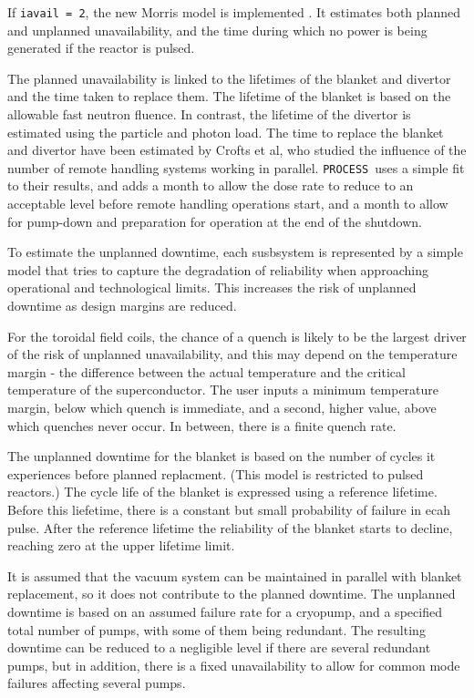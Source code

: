 \documentclass[11pt,a4paper]{report}
\newcommand{\process}{\mbox{\texttt{PROCESS}}}
\begin{document}
If \texttt{iavail = 2}, the new Morris model is implemented \cite{kovari_eng}. It estimates both planned and unplanned unavailability, and the time during which no power is being generated if the reactor is pulsed. 

The planned unavailability is linked to the lifetimes of the blanket and divertor and the time taken to replace them.  The lifetime of the blanket is based on the allowable fast neutron fluence.  In contrast, the lifetime of the divertor is estimated using the particle and photon load. The time to replace the blanket and divertor have been estimated by Crofts et al, who studied the influence of the number of remote handling systems working in parallel.  \process\ uses a simple fit to their results, and adds a month to allow the dose rate to reduce to an acceptable level before remote handling operations start, and a month to allow for pump-down and preparation for operation at the end of the shutdown.   

To estimate the unplanned downtime, each susbsystem is represented by a simple model that tries to capture the degradation of reliability when approaching operational and technological limits.  This increases the risk of unplanned downtime as design margins are reduced.

For the toroidal field coils, the chance of a quench is likely to be the largest driver of the risk of unplanned unavailability, and this may depend on the temperature margin - the difference between the actual temperature and the critical temperature of the superconductor.  The user inputs a minimum temperature margin, below which quench is immediate, and a second, higher value, above which quenches never occur.  In between, there is a finite quench rate.

The unplanned downtime for the blanket is based on the number of cycles it experiences before planned replacment.  (This model is restricted to pulsed reactors.) The cycle life of the blanket is expressed using a reference lifetime.  Before this liefetime, there is a constant but small probability of failure in ecah pulse.  After the reference lifetime the reliability of the blanket starts to decline, reaching zero at the upper lifetime limit.

It is assumed that the vacuum system can be maintained in parallel with blanket replacement, so it does not contribute to the planned downtime.  The unplanned downtime is based on an assumed failure rate for a cryopump, and a specified total number of pumps, with some of them being redundant.  The resulting downtime can be reduced to a negligible level if there are several redundant pumps, but in addition, there is a fixed unavailability to allow for common mode failures affecting several pumps.
\end{document}
